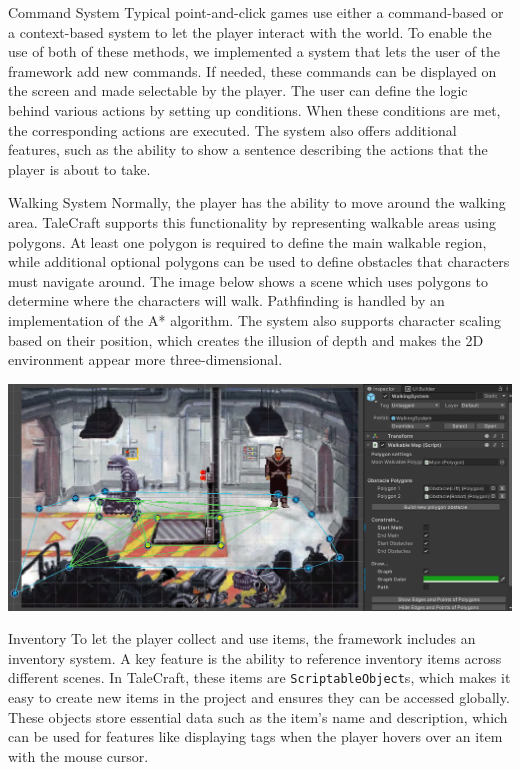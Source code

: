 \documentclass[portrait,a0paper,fontscale=0.34]{baposter}
\begin{document}
\begin{poster}
\begin{posterbox}[column=0, span=1, name=cs, below=architecture]{Command System}
Typical point-and-click games use either a command-based or a context-based system to let the player interact with the world. To enable the use of both of these methods, we implemented a system that lets the user of the framework add new commands. If needed, these commands can be displayed on the screen and made selectable by the player. The user can define the logic behind various actions by setting up conditions. When these conditions are met, the corresponding actions are executed.  The system also offers additional features, such as the ability to show a sentence describing the actions that the player is about to take.


\end{posterbox}

\begin{posterbox}[column=0, span=1, name=ws, below=cs]{Walking System}
Normally, the player has the ability to move around the walking area. TaleCraft supports this functionality by representing walkable areas using polygons. At least one polygon is required to define the main walkable region, while additional optional polygons can be used to define obstacles that characters must navigate around. The image below shows a scene which uses polygons to determine where the characters will walk. Pathfinding is handled by an implementation of the A* algorithm. The system also supports character scaling based on their position, which creates the illusion of depth and makes the 2D environment appear more three-dimensional. 

\begin{center}
\includegraphics[width=0.75\linewidth]{img/walkable_map3.png}
\end{center}
\end{posterbox}

%
%
%

\begin{posterbox}[column=1, span=1, name=is]{Inventory}
To let the player collect and use items, the framework includes an inventory system. A key feature is the ability to reference inventory items across different scenes. In TaleCraft, these items are \verb|ScriptableObject|s, which makes it easy to create new items in the project and ensures they can be accessed globally. These objects store essential data such as the item's name and description, which can be used for features like displaying tags when the player hovers over an item with the mouse cursor.
\end{posterbox}


\end{poster}
\end{document}
